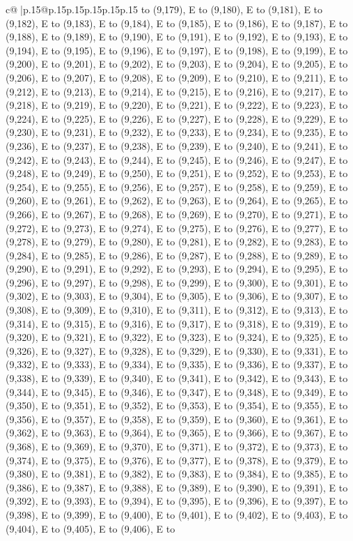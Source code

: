 \documentclass{article}
\begin{document}
{\begin{supertabular}{c@{$\;$}|p{.15\linewidth}@{}p{.15\linewidth}p{.15\linewidth}p{.15\linewidth}p{.15\linewidth}p{.15\linewidth}}
{{{to (9,179), E to (9,180), E to (9,181), E to (9,182), E to (9,183), E to (9,184), E to (9,185), E to (9,186), E to (9,187), E to (9,188), E to (9,189), E to (9,190), E to (9,191), E to (9,192), E to (9,193), E to (9,194), E to (9,195), E to (9,196), E to (9,197), E to (9,198), E to (9,199), E to (9,200), E to (9,201), E to (9,202), E to (9,203), E to (9,204), E to (9,205), E to (9,206), E to (9,207), E to (9,208), E to (9,209), E to (9,210), E to (9,211), E to (9,212), E to (9,213), E to (9,214), E to (9,215), E to (9,216), E to (9,217), E to (9,218), E to (9,219), E to (9,220), E to (9,221), E to (9,222), E to (9,223), E to (9,224), E to (9,225), E to (9,226), E to (9,227), E to (9,228), E to (9,229), E to (9,230), E to (9,231), E to (9,232), E to (9,233), E to (9,234), E to (9,235), E to (9,236), E to (9,237), E to (9,238), E to (9,239), E to (9,240), E to (9,241), E to (9,242), E to (9,243), E to (9,244), E to (9,245), E to (9,246), E to (9,247), E to (9,248), E to (9,249), E to (9,250), E to (9,251), E to (9,252), E to (9,253), E to (9,254), E to (9,255), E to (9,256), E to (9,257), E to (9,258), E to (9,259), E to (9,260), E to (9,261), E to (9,262), E to (9,263), E to (9,264), E to (9,265), E to (9,266), E to (9,267), E to (9,268), E to (9,269), E to (9,270), E to (9,271), E to (9,272), E to (9,273), E to (9,274), E to (9,275), E to (9,276), E to (9,277), E to (9,278), E to (9,279), E to (9,280), E to (9,281), E to (9,282), E to (9,283), E to (9,284), E to (9,285), E to (9,286), E to (9,287), E to (9,288), E to (9,289), E to (9,290), E to (9,291), E to (9,292), E to (9,293), E to (9,294), E to (9,295), E to (9,296), E to (9,297), E to (9,298), E to (9,299), E to (9,300), E to (9,301), E to (9,302), E to (9,303), E to (9,304), E to (9,305), E to (9,306), E to (9,307), E to (9,308), E to (9,309), E to (9,310), E to (9,311), E to (9,312), E to (9,313), E to (9,314), E to (9,315), E to (9,316), E to (9,317), E to (9,318), E to (9,319), E to (9,320), E to (9,321), E to (9,322), E to (9,323), E to (9,324), E to (9,325), E to (9,326), E to (9,327), E to (9,328), E to (9,329), E to (9,330), E to (9,331), E to (9,332), E to (9,333), E to (9,334), E to (9,335), E to (9,336), E to (9,337), E to (9,338), E to (9,339), E to (9,340), E to (9,341), E to (9,342), E to (9,343), E to (9,344), E to (9,345), E to (9,346), E to (9,347), E to (9,348), E to (9,349), E to (9,350), E to (9,351), E to (9,352), E to (9,353), E to (9,354), E to (9,355), E to (9,356), E to (9,357), E to (9,358), E to (9,359), E to (9,360), E to (9,361), E to (9,362), E to (9,363), E to (9,364), E to (9,365), E to (9,366), E to (9,367), E to (9,368), E to (9,369), E to (9,370), E to (9,371), E to (9,372), E to (9,373), E to (9,374), E to (9,375), E to (9,376), E to (9,377), E to (9,378), E to (9,379), E to (9,380), E to (9,381), E to (9,382), E to (9,383), E to (9,384), E to (9,385), E to (9,386), E to (9,387), E to (9,388), E to (9,389), E to (9,390), E to (9,391), E to (9,392), E to (9,393), E to (9,394), E to (9,395), E to (9,396), E to (9,397), E to (9,398), E to (9,399), E to (9,400), E to (9,401), E to (9,402), E to (9,403), E to (9,404), E to (9,405), E to (9,406), E to }}}
\end{supertabular}}
\end{document}
